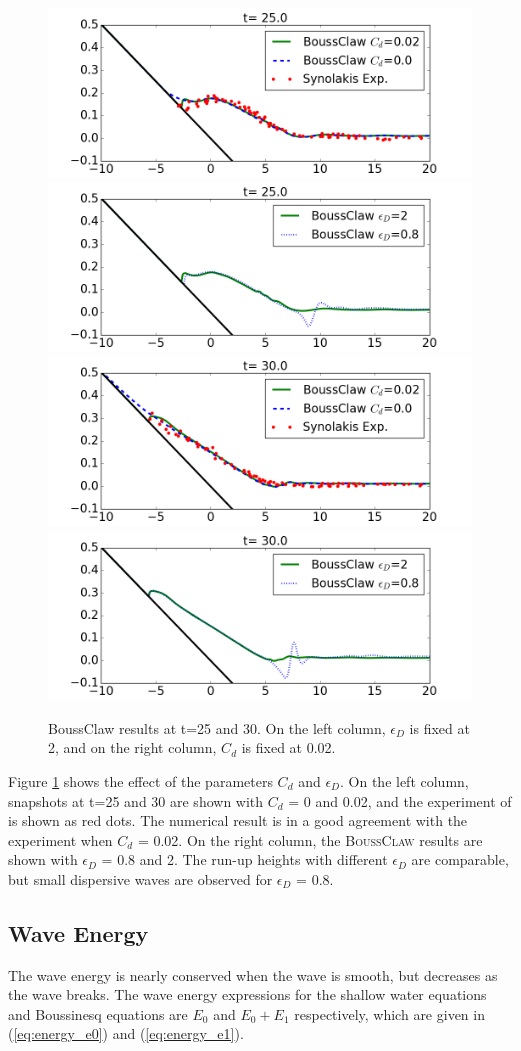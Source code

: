 \documentclass[review]{elsarticle}
\begin{document}
\begin{figure}[!htb]
\centering
\includegraphics[width=.45\textwidth]{_fig/BoussClaw_lab_Cd_t25}
\includegraphics[width=.45\textwidth]{_fig/BoussClaw_eD_t25}\\
\includegraphics[width=.45\textwidth]{_fig/BoussClaw_lab_Cd_t30}
\includegraphics[width=.45\textwidth]{_fig/BoussClaw_eD_t30}
\caption{BoussClaw results at t=25 and 30. On the left column, 
	$\epsilon_D$ is fixed at 2, and 
	on the right column, $C_d$ is fixed at 0.02.}
\label{fig:BoussClaw_runup}
\end{figure}

Figure \ref{fig:BoussClaw_runup} shows
the effect of the parameters $C_d$ and $\epsilon_D$.
On the left column, snapshots at t=25 and 30 are shown
with $C_d$ = 0 and 0.02, 
and the experiment of \cite{synolakis1987runup} is shown as red dots.
The numerical result is in a good agreement with the experiment
when $C_d$ = 0.02. 
On the right column, the \textsc{BoussClaw} results 
are shown with $\epsilon_D$ = 0.8 and 2.
The run-up heights with different $\epsilon_D$ are comparable,
but small dispersive waves are observed for $\epsilon_D$ = 0.8. 

\subsection{Wave Energy}

The wave energy is nearly conserved when the wave is smooth, 
but decreases as the wave breaks.
The wave energy expressions 
for the shallow water equations and Boussinesq equations
are $E_0$ and $E_0+E_1$  respectively, 
which are given in (\ref{eq:energy_e0}) and (\ref{eq:energy_e1}). 
\end{document}
